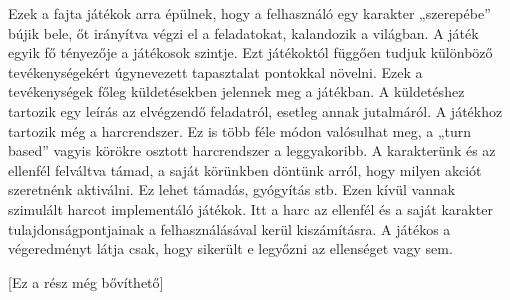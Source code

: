 Ezek a fajta játékok arra épülnek, hogy a felhasználó egy karakter „szerepébe” bújik bele, őt irányítva végzi el a feladatokat, kalandozik a világban. A játék egyik fő tényezője a játékosok szintje. Ezt játékoktól függően tudjuk különböző tevékenységekért úgynevezett tapasztalat pontokkal növelni. Ezek a tevékenységek főleg küldetésekben jelennek meg a játékban. A küldetéshez tartozik egy leírás az elvégzendő feladatról, esetleg annak jutalmáról. A játékhoz tartozik még a harcrendszer. Ez is több féle módon valósulhat meg, a „turn based” vagyis körökre osztott harcrendszer a leggyakoribb. A karakterünk és az ellenfél felváltva támad, a saját körünkben döntünk arról, hogy milyen akciót szeretnénk aktiválni. Ez lehet támadás, gyógyítás stb. Ezen kívül vannak szimulált harcot implementáló játékok. Itt a harc az ellenfél és a saját karakter tulajdonságpontjainak a felhasználásával kerül kiszámításra. A játékos a végeredményt látja csak, hogy sikerült e legyőzni az ellenséget vagy sem.

[Ez a rész még bővíthető]
\newpage







